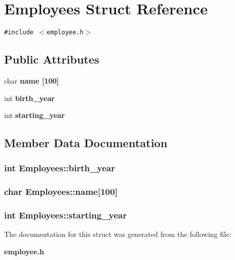 \section{Employees Struct Reference}
\label{structEmployees}
{\tt \#include $<$employee.h$>$}

\subsection*{Public Attributes}
\begin{CompactItemize}
\item 
char \bf{name} [100]
\item 
int \bf{birth\_\-year}
\item 
int \bf{starting\_\-year}
\end{CompactItemize}


\subsection{Member Data Documentation}
\subsubsection{\setlength{\rightskip}{0pt plus 5cm}int \bf{Employees::birth\_\-year}}\label{structEmployees_a0d46715aa6a359a97aced4579dcb52d}


\subsubsection{\setlength{\rightskip}{0pt plus 5cm}char \bf{Employees::name}[100]}\label{structEmployees_816b7fb0a77d2dff3eb2dd82d06d7e4f}


\subsubsection{\setlength{\rightskip}{0pt plus 5cm}int \bf{Employees::starting\_\-year}}\label{structEmployees_ad1f0b6d739df05b6ccf43afc99667bd}




The documentation for this struct was generated from the following file:\begin{CompactItemize}
\item 
\bf{employee.h}\end{CompactItemize}
